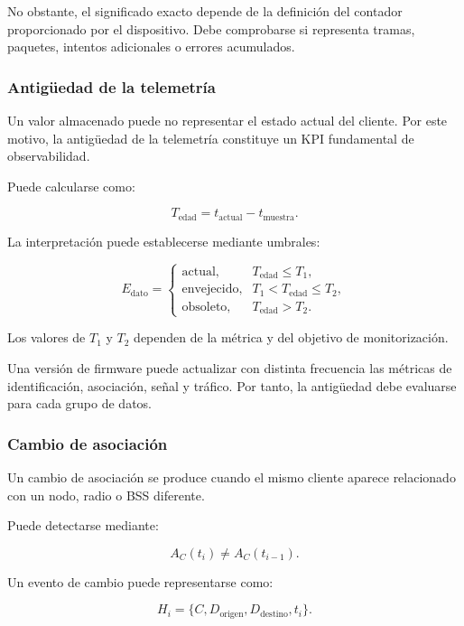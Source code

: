 No obstante, el significado exacto depende de la definición del contador
proporcionado por el dispositivo. Debe comprobarse si representa tramas,
paquetes, intentos adicionales o errores acumulados.


\subsubsection*{Antigüedad de la telemetría}

Un valor almacenado puede no representar el estado actual del cliente.
Por este motivo, la antigüedad de la telemetría constituye un KPI
fundamental de observabilidad.

Puede calcularse como:

\[
    T_{\mathrm{edad}}
    =
    t_{\mathrm{actual}}
    -
    t_{\mathrm{muestra}}.
\]

La interpretación puede establecerse mediante umbrales:

\[
    E_{\mathrm{dato}}
    =
    \begin{cases}
        \text{actual}, &
        T_{\mathrm{edad}}
        \leq
        T_1,\\
        \text{envejecido}, &
        T_1
        <
        T_{\mathrm{edad}}
        \leq
        T_2,\\
        \text{obsoleto}, &
        T_{\mathrm{edad}}
        >
        T_2.
    \end{cases}
\]

Los valores de \(T_1\) y \(T_2\) dependen de la métrica y del objetivo de
monitorización.

Una versión de firmware puede actualizar con distinta frecuencia las
métricas de identificación, asociación, señal y tráfico. Por tanto, la
antigüedad debe evaluarse para cada grupo de datos.


\subsubsection*{Cambio de asociación}

Un cambio de asociación se produce cuando el mismo cliente aparece
relacionado con un nodo, radio o BSS diferente.

Puede detectarse mediante:

\[
    A_C(t_{i})
    \neq
    A_C(t_{i-1}).
\]

Un evento de cambio puede representarse como:

\[
    H_i
    =
    \{
        C,
        D_{\mathrm{origen}},
        D_{\mathrm{destino}},
        t_i
    \}.
\]


